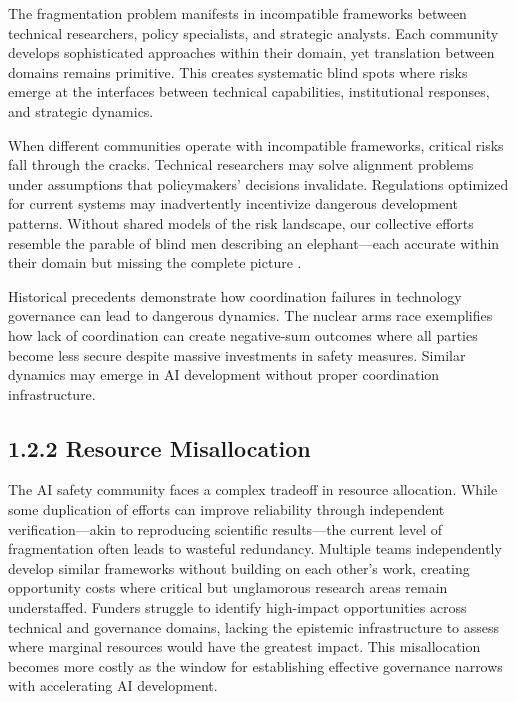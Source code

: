 \documentclass[
  11pt,
  letterpaper,
]{book}
\begin{document}
The fragmentation problem manifests in incompatible frameworks between
technical researchers, policy specialists, and strategic analysts. Each
community develops sophisticated approaches within their domain, yet
translation between domains remains primitive. This creates systematic
blind spots where risks emerge at the interfaces between technical
capabilities, institutional responses, and strategic dynamics.

When different communities operate with incompatible frameworks,
critical risks fall through the cracks. Technical researchers may solve
alignment problems under assumptions that policymakers' decisions
invalidate. Regulations optimized for current systems may inadvertently
incentivize dangerous development patterns. Without shared models of the
risk landscape, our collective efforts resemble the parable of blind men
describing an elephant---each accurate within their domain but missing
the complete picture \textcite{paul2023}.

Historical precedents demonstrate how coordination failures in
technology governance can lead to dangerous dynamics. The nuclear arms
race exemplifies how lack of coordination can create negative-sum
outcomes where all parties become less secure despite massive
investments in safety measures. Similar dynamics may emerge in AI
development without proper coordination infrastructure.

\subsection{1.2.2 Resource Misallocation}\label{resource-misallocation}

The AI safety community faces a complex tradeoff in resource allocation.
While some duplication of efforts can improve reliability through
independent verification---akin to reproducing scientific results---the
current level of fragmentation often leads to wasteful redundancy.
Multiple teams independently develop similar frameworks without building
on each other's work, creating opportunity costs where critical but
unglamorous research areas remain understaffed. Funders struggle to
identify high-impact opportunities across technical and governance
domains, lacking the epistemic infrastructure to assess where marginal
resources would have the greatest impact. This misallocation becomes
more costly as the window for establishing effective governance narrows
with accelerating AI development.
\end{document}
